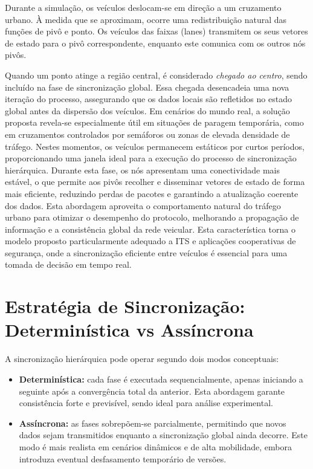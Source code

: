 Durante a simulação, os veículos deslocam-se em direção a um cruzamento urbano. À medida que se aproximam, ocorre uma redistribuição natural das funções de pivô e ponto.  
Os veículos das faixas (lanes) transmitem os seus vetores de estado para o pivô correspondente, enquanto este comunica com os outros nós pivôs.

Quando um ponto atinge a região central, é considerado \textit{chegado ao centro}, sendo incluído na fase de sincronização global. Essa chegada desencadeia uma nova iteração do processo, assegurando que os dados locais são refletidos no estado global antes da dispersão dos veículos.
Em cenários do mundo real, a solução proposta revela-se especialmente útil em situações de paragem temporária, como em cruzamentos controlados por semáforos ou zonas de elevada densidade de tráfego. Nestes momentos, os veículos permanecem estáticos por curtos períodos, proporcionando uma janela ideal para a execução do processo de sincronização hierárquica. Durante esta fase, os nós apresentam uma conectividade mais estável, o que permite aos pivôs recolher e disseminar vetores de estado de forma mais eficiente, reduzindo perdas de pacotes e garantindo a atualização coerente dos dados. Esta abordagem aproveita o comportamento natural do tráfego urbano para otimizar o desempenho do protocolo, melhorando a propagação de informação e a consistência global da rede veicular.
Esta característica torna o modelo proposto particularmente adequado a \gls{ITS} e aplicações cooperativas de segurança, onde a sincronização eficiente entre veículos é essencial para uma tomada de decisão em tempo real.

\section{Estratégia de Sincronização: Determinística vs Assíncrona}

A sincronização hierárquica pode operar segundo dois modos conceptuais:

\begin{itemize}
    \item \textbf{Determinística:} cada fase é executada sequencialmente, apenas iniciando a seguinte após a convergência total da anterior. Esta abordagem garante consistência forte e previsível, sendo ideal para análise experimental.
    \item \textbf{Assíncrona:} as fases sobrepõem-se parcialmente, permitindo que novos dados sejam transmitidos enquanto a sincronização global ainda decorre. Este modo é mais realista em cenários dinâmicos e de alta mobilidade, embora introduza eventual desfasamento temporário de versões.
\end{itemize}

